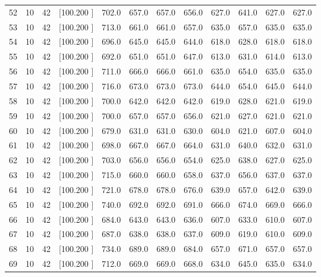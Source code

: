\documentclass[12pt,a4paper]{article}
\begin{document}
\begin{center}
{\begin{tabular}{r r r r r r r r r r r r}
  52& 10& 42&[100.200   ]&   702.0&   657.0&   657.0&   656.0&   627.0&   641.0&   627.0&   627.0\\[-0.02in]
  53& 10& 42&[100.200   ]&   713.0&   661.0&   661.0&   657.0&   635.0&   657.0&   635.0&   635.0\\[-0.02in]
  54& 10& 42&[100.200   ]&   696.0&   645.0&   645.0&   644.0&   618.0&   628.0&   618.0&   618.0\\[-0.02in]
  55& 10& 42&[100.200   ]&   692.0&   651.0&   651.0&   647.0&   613.0&   631.0&   614.0&   613.0\\[-0.02in]
  56& 10& 42&[100.200   ]&   711.0&   666.0&   666.0&   661.0&   635.0&   654.0&   635.0&   635.0\\[-0.02in]
  57& 10& 42&[100.200   ]&   716.0&   673.0&   673.0&   673.0&   644.0&   654.0&   645.0&   644.0\\[-0.02in]
  58& 10& 42&[100.200   ]&   700.0&   642.0&   642.0&   642.0&   619.0&   628.0&   621.0&   619.0\\[-0.02in]
  59& 10& 42&[100.200   ]&   700.0&   657.0&   657.0&   656.0&   621.0&   627.0&   621.0&   621.0\\[-0.02in]
  60& 10& 42&[100.200   ]&   679.0&   631.0&   631.0&   630.0&   604.0&   621.0&   607.0&   604.0\\[-0.02in]
  61& 10& 42&[100.200   ]&   698.0&   667.0&   667.0&   664.0&   631.0&   640.0&   632.0&   631.0\\[-0.02in]
  62& 10& 42&[100.200   ]&   703.0&   656.0&   656.0&   654.0&   625.0&   638.0&   627.0&   625.0\\[-0.02in]
  63& 10& 42&[100.200   ]&   715.0&   660.0&   660.0&   658.0&   637.0&   656.0&   637.0&   637.0\\[-0.02in]
  64& 10& 42&[100.200   ]&   721.0&   678.0&   678.0&   676.0&   639.0&   657.0&   642.0&   639.0\\[-0.02in]
  65& 10& 42&[100.200   ]&   740.0&   692.0&   692.0&   691.0&   666.0&   674.0&   669.0&   666.0\\[-0.02in]
  66& 10& 42&[100.200   ]&   684.0&   643.0&   643.0&   636.0&   607.0&   633.0&   610.0&   607.0\\[-0.02in]
  67& 10& 42&[100.200   ]&   687.0&   638.0&   638.0&   637.0&   609.0&   619.0&   610.0&   609.0\\[-0.02in]
  68& 10& 42&[100.200   ]&   734.0&   689.0&   689.0&   684.0&   657.0&   671.0&   657.0&   657.0\\[-0.02in]
  69& 10& 42&[100.200   ]&   712.0&   669.0&   669.0&   668.0&   634.0&   645.0&   635.0&   634.0\\[-0.02in]

\end{tabular}}
\end{center}
\end{document}
